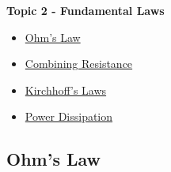\documentclass[fleqn]{beamer} %
\newcommand{\sectionIItitle}{Fundamental Laws}
\newcommand{\sectionIIsubsectionItitle}{Ohm's Law}
\newcommand{\sectionIIsubsectionIItitle}{Combining Resistance}
\newcommand{\sectionIIsubsectionIIItitle}{Kirchhoff's Laws}
\newcommand{\sectionIIsubsectionIVtitle}{Power Dissipation}
\begin{document}
		\begin{frame}
			\large \textbf{Topic 2 - \sectionIItitle} \vspace{3mm}\\

			\begin{itemize}
				\item \hyperlink{sectionIIsubsectionI}{\sectionIIsubsectionItitle} \vspc %
				\item \hyperlink{sectionIIsubsectionII}{\sectionIIsubsectionIItitle} \vspc %
				\item \hyperlink{sectionIIsubsectionIII}{\sectionIIsubsectionIIItitle} \vspc %
				\item \hyperlink{sectionIIsubsectionIV}{\sectionIIsubsectionIVtitle} \vspc %
			\end{itemize}

		\end{frame}

		\subsection{\sectionIIsubsectionItitle}\label{sectionIIsubsectionI}
\end{document}
